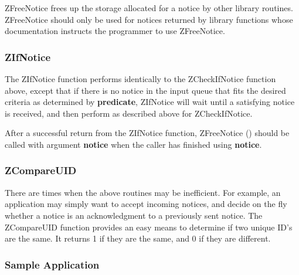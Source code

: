 \etemplate
{}

ZFreeNotice frees up the storage allocated for a notice by other library
routines.  ZFreeNotice should only be used for notices returned by
library functions whose documentation instructs the programmer to use
ZFreeNotice.

\subsubsection{ZIfNotice}
\label{ZIfNotice}

\etemplate
{}

The ZIfNotice function performs identically to the ZCheckIfNotice
function above, except that if there is no notice in the input queue
that fits the desired criteria as determined by {\bf predicate},
ZIfNotice will wait until a satisfying notice is received, and then
perform as described above for ZCheckIfNotice.

After a successful return from the ZIfNotice function,
ZFreeNotice () should be called with argument {\bf
notice} when the caller has finished using {\bf notice}.

\subsubsection{ZCompareUID}
\label{ZCompareUID}

\etemplate
{}

There are times when the above routines may be inefficient.  For
example, an application may simply want to accept incoming notices,
and decide on the fly whether a notice is an acknowledgment to a
previously sent notice.  The ZCompareUID function provides an easy
means to determine if two unique ID's are the same.  It returns 1 if
they are the same, and 0 if they are different.

\subsubsection{Sample Application}

